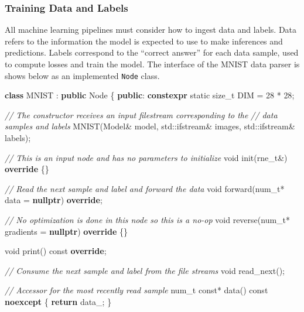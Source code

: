 \documentclass[
]{article}
\newenvironment{Shaded}{}{}
\newcommand{\AttributeTok}[1]{\textcolor[rgb]{0.49,0.56,0.16}{#1}}
\newcommand{\BuiltInTok}[1]{#1}
\newcommand{\CommentTok}[1]{\textcolor[rgb]{0.38,0.63,0.69}{\textit{#1}}}
\newcommand{\ControlFlowTok}[1]{\textcolor[rgb]{0.00,0.44,0.13}{\textbf{#1}}}
\newcommand{\DataTypeTok}[1]{\textcolor[rgb]{0.56,0.13,0.00}{#1}}
\newcommand{\DecValTok}[1]{\textcolor[rgb]{0.25,0.63,0.44}{#1}}
\newcommand{\KeywordTok}[1]{\textcolor[rgb]{0.00,0.44,0.13}{\textbf{#1}}}
\newcommand{\NormalTok}[1]{#1}
\newcommand{\VariableTok}[1]{\textcolor[rgb]{0.10,0.09,0.49}{#1}}
\begin{document}
\hypertarget{training-data-and-labels}{%
\subsubsection{Training Data and
Labels}\label{training-data-and-labels}}

All machine learning pipelines must consider how to ingest data and
labels. Data refers to the information the model is expected to use to
make inferences and predictions. Labels correspond to the ``correct
answer'' for each data sample, used to compute losses and train the
model. The interface of the MNIST data parser is shows below as an
implemented \texttt{Node} class.

\begin{Shaded}
\begin{Highlighting}[]
\KeywordTok{class}\NormalTok{ MNIST : }\KeywordTok{public}\NormalTok{ Node}
\NormalTok{\{}
\KeywordTok{public}\NormalTok{:}
    \KeywordTok{constexpr} \AttributeTok{static} \DataTypeTok{size\_t}\NormalTok{ DIM = }\DecValTok{28}\NormalTok{ * }\DecValTok{28}\NormalTok{;}
    
    \CommentTok{// The constructor receives an input filestream corresponding to the}
    \CommentTok{// data samples and labels}
\NormalTok{    MNIST(Model\& model, }\BuiltInTok{std::}\NormalTok{ifstream\& images, }\BuiltInTok{std::}\NormalTok{ifstream\& labels);}
    
    \CommentTok{// This is an input node and has no parameters to initialize}
    \DataTypeTok{void}\NormalTok{ init(}\DataTypeTok{rne\_t}\NormalTok{\&) }\KeywordTok{override}\NormalTok{ \{\}}
    
    \CommentTok{// Read the next sample and label and forward the data}
    \DataTypeTok{void}\NormalTok{ forward(}\DataTypeTok{num\_t}\NormalTok{* data = }\KeywordTok{nullptr}\NormalTok{) }\KeywordTok{override}\NormalTok{;}

    \CommentTok{// No optimization is done in this node so this is a no{-}op}
    \DataTypeTok{void}\NormalTok{ reverse(}\DataTypeTok{num\_t}\NormalTok{* gradients = }\KeywordTok{nullptr}\NormalTok{) }\KeywordTok{override}\NormalTok{ \{\}}
    
    \DataTypeTok{void}\NormalTok{ print() }\AttributeTok{const} \KeywordTok{override}\NormalTok{;}

    \CommentTok{// Consume the next sample and label from the file streams}
    \DataTypeTok{void}\NormalTok{ read\_next();}
    
    \CommentTok{// Accessor for the most recently read sample}
    \DataTypeTok{num\_t} \AttributeTok{const}\NormalTok{* data() }\AttributeTok{const} \KeywordTok{noexcept}
\NormalTok{    \{}
        \ControlFlowTok{return} \VariableTok{data\_}\NormalTok{;}
\NormalTok{    \}}
    

\end{Highlighting}
\end{Shaded}
\end{document}
